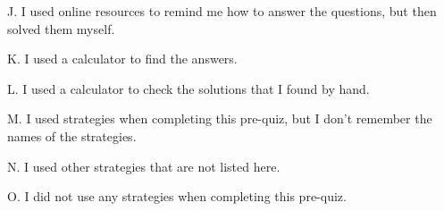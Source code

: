 \documentclass{ximera}
\begin{document}
\begin{question}
\begin{question}
    J. I used online resources to remind me how to answer the questions, but then solved them myself.

    \begin{multipleChoice}
    \end{multipleChoice}
    
\end{question}

\begin{question}    
    
    K. I used a calculator to find the answers.

    \begin{multipleChoice}
    \end{multipleChoice}
    
\end{question}

\begin{question}    
    
    L. I used a calculator to check the solutions that I found by hand.

    \begin{multipleChoice}
    \end{multipleChoice}
    
\end{question}

\begin{question}    
    
    M. I used strategies when completing this pre-quiz, but I don't remember the names of the strategies.

    \begin{multipleChoice}
    \end{multipleChoice}
    
\end{question}
\begin{question}    
    
    N. I used other strategies that are not listed here.

    \begin{multipleChoice}
    \end{multipleChoice}
   
\end{question}
\begin{question}    
    
    O. I did not use any strategies when completing this pre-quiz.

    \begin{multipleChoice}
    \end{multipleChoice}

\end{question}
\end{question}
\end{document}
